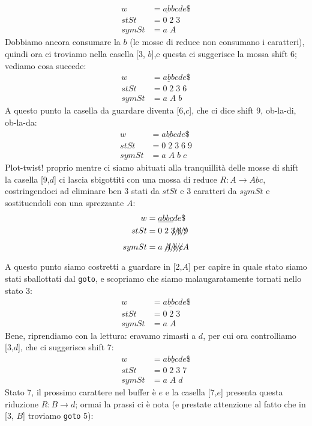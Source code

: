 \documentclass[class=book, crop=false, oneside, 12pt]{standalone}
\begin{document}
\begin{align*}
    w &= \underline{ab}bcde\$ \\
    stSt &= 0\;2\;3\\
    symSt &= a\;A
\end{align*}
Dobbiamo ancora consumare la \(b\) (le mosse di reduce non consumano i caratteri), quindi ora ci troviamo nella casella [3, \(b\)],e questa ci suggerisce la mossa shift 6; vediamo cosa succede:
\begin{align*}
    w &= \underline{abb}cde\$ \\
    stSt &= 0\;2\;3\;6\\
    symSt &= a\;A\;b
\end{align*}
A questo punto la casella da guardare diventa [6,\(c\)], che ci dice shift 9, ob-la-di, ob-la-da:
\begin{align*}
    w &= \underline{abbc}de\$ \\
    stSt &= 0\;2\;3\;6\;9\\
    symSt &= a\;A\;b\;c
\end{align*}
Plot-twist! proprio mentre ci siamo abituati alla tranquillità delle mosse di shift la casella [9,\(d\)] ci lascia sbigottiti con una mossa di reduce \(R: A \to Abc\), costringendoci ad eliminare ben 3 stati da \(stSt\) e 3 caratteri da \(symSt\) e sostituendoli con una sprezzante \(A\):
\begin{align*}
    w &= \underline{abbc}de\$ \\
    stSt &= 0\;2\;\xout{3\;6\;9}\\
    symSt &= a\;\xout{A\;b\;c}A
\end{align*}
A questo punto siamo costretti a guardare in [2,\(A\)] per capire in quale stato siamo stati sballottati dal \texttt{goto}, e scopriamo che siamo malaugaratamente tornati nello stato 3:
\begin{align*}
    w &= \underline{abbc}de\$ \\
    stSt &= 0\;2\;3\\
    symSt &= a\;A
\end{align*}
Bene, riprendiamo con la lettura: eravamo rimasti a \(d\), per cui ora controlliamo [3,\(d\)], che ci suggerisce shift 7:
\begin{align*}
    w &= \underline{abbcd}e\$ \\
    stSt &= 0\;2\;3\;7\\
    symSt &= a\;A\;d
\end{align*}
Stato 7, il prossimo carattere nel buffer è \(e\) e la casella [7,\(e\)] presenta questa riduzione \(R: B\to d\); ormai la prassi ci è nota (e prestate attenzione al fatto che in [3, \(B\)] troviamo \texttt{goto} 5):
\end{document}
